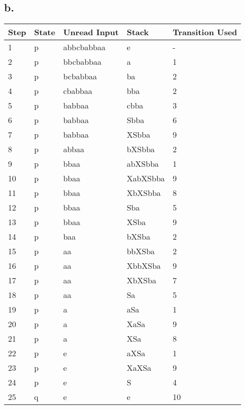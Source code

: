 \documentclass[12pt]{article}
\begin{document}
\subsection*{b.}
\begin{table}[H]
\centering
\begin{tabular}{|l|l|l|l|l|}
\hline
Step & State & Unread Input & Stack    & Transition Used \\ \hline
1    & p     & abbcbabbaa   & e        & -               \\ \hline
2    & p     & bbcbabbaa    & a        & 1               \\ \hline
3    & p     & bcbabbaa     & ba       & 2               \\ \hline
4    & p     & cbabbaa      & bba      & 2               \\ \hline
5    & p     & babbaa       & cbba     & 3               \\ \hline
6    & p     & babbaa       & Sbba     & 6               \\ \hline
7    & p     & babbaa       & XSbba    & 9               \\ \hline
8    & p     & abbaa        & bXSbba   & 2               \\ \hline
9    & p     & bbaa         & abXSbba  & 1               \\ \hline
10   & p     & bbaa         & XabXSbba & 9               \\ \hline
11   & p     & bbaa         & XbXSbba  & 8               \\ \hline
12   & p     & bbaa         & Sba      & 5               \\ \hline
13   & p     & bbaa         & XSba     & 9               \\ \hline
14   & p     & baa          & bXSba    & 2               \\ \hline
15   & p     & aa           & bbXSba   & 2               \\ \hline
16   & p     & aa           & XbbXSba  & 9               \\ \hline
17   & p     & aa           & XbXSba   & 7               \\ \hline
18   & p     & aa           & Sa       & 5               \\ \hline
19   & p     & a            & aSa      & 1               \\ \hline
20   & p     & a            & XaSa     & 9               \\ \hline
21   & p     & a            & XSa      & 8               \\ \hline
22   & p     & e            & aXSa     & 1               \\ \hline
23   & p     & e            & XaXSa    & 9               \\ \hline
24   & p     & e            & S        & 4               \\ \hline
25   & q     & e            & e        & 10              \\ \hline
\end{tabular}
\end{table}
\end{document}
